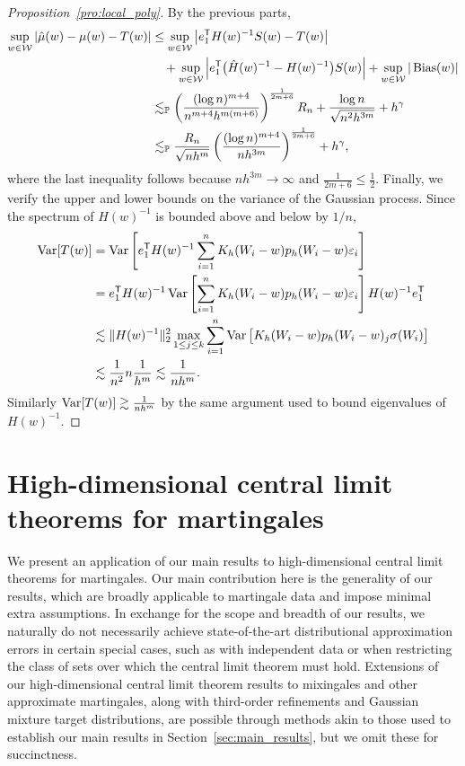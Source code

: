 \begin{proof}[Proposition~\ref{pro:local_poly}]
  By the previous parts,
  \begin{align*}
    \sup_{w \in \mathcal{W}}
    \left|\hat \mu(w) - \mu(w) - T(w) \right|
    &\leq
    \sup_{w \in \mathcal{W}}
    \left|e_1^{\mathsf{T}} H(w)^{-1} S(w) - T(w) \right| \\
    &\quad+
    \sup_{w \in \mathcal{W}}
    \left| e_1^{\mathsf{T}} \big(\hat H(w)^{-1} - H(w)^{-1}\big) S(w) \right|
    + \sup_{w \in \mathcal{W}}
    |\operatorname{Bias}(w)| \\
    &\lesssim_{\mathbb{P}}
    \left(
      \frac{(\log n)^{m+4}}{n^{m+4}h^{m(m+6)}}
    \right)^{\frac{1}{2m+6}} R_n
    + \frac{\log n}{\sqrt{n^2 h^{3m}}}
    + h^\gamma \\
    &\lesssim_{\mathbb{P}}
    \frac{R_n}{\sqrt{n h^m}}
    \left(
      \frac{(\log n)^{m+4}}{n h^{3m}}
    \right)^{\frac{1}{2m+6}}
    + h^\gamma,
  \end{align*}
  where the last inequality follows because
  $n h^{3m} \to \infty$
  and $\frac{1}{2m+6} \leq \frac{1}{2}$.
  Finally, we verify the upper and lower bounds
  on the variance of the Gaussian process.
  Since the spectrum of $H(w)^{-1}$
  is bounded above and below by $1/n$,
  \begin{align*}
    \operatorname{Var}[T(w)]
    &=
    \operatorname{Var}\left[
      e_1^{\mathsf{T}} H(w)^{-1}
      \sum_{i=1}^n K_h(W_i-w) p_h(W_i-w) \varepsilon_i
    \right] \\
    &=
    e_1^{\mathsf{T}} H(w)^{-1}
    \operatorname{Var}\left[
      \sum_{i=1}^n K_h(W_i-w) p_h(W_i-w) \varepsilon_i
    \right]
    H(w)^{-1} e_1^{\mathsf{T}} \\
    &\lesssim
    \|H(w)^{-1}\|_2^2
    \max_{1 \leq j \leq k}
    \sum_{i=1}^n
    \operatorname{Var}\big[
      K_h(W_i-w) p_h(W_i-w)_j \sigma(W_i)
    \big] \\
    &\lesssim
    \frac{1}{n^2} n
    \frac{1}{h^m}
    \lesssim
    \frac{1}{n h^m}.
  \end{align*}
  Similarly
  $\operatorname{Var}[T(w)] \gtrsim \frac{1}{n h^m}$
  by the same argument used to bound eigenvalues of
  $H(w)^{-1}$.
\end{proof}

\section{High-dimensional central limit theorems for martingales}%
\label{sec:high_dim_clt}

We present an application of our main results to
high-dimensional central limit theorems for martingales. Our main
contribution here is the generality of our results, which are broadly
applicable to martingale data and impose minimal extra assumptions. In exchange
for the scope and breadth of our results, we naturally do not necessarily
achieve state-of-the-art distributional approximation errors in certain special
cases, such as with independent data or when restricting the class of sets over
which the central limit theorem must hold. Extensions of our high-dimensional
central limit theorem results to mixingales and other approximate martingales,
along with third-order refinements and Gaussian mixture target distributions,
are possible through methods akin to those used to establish our main results
in Section~\ref{sec:main_results}, but we omit these for succinctness.

